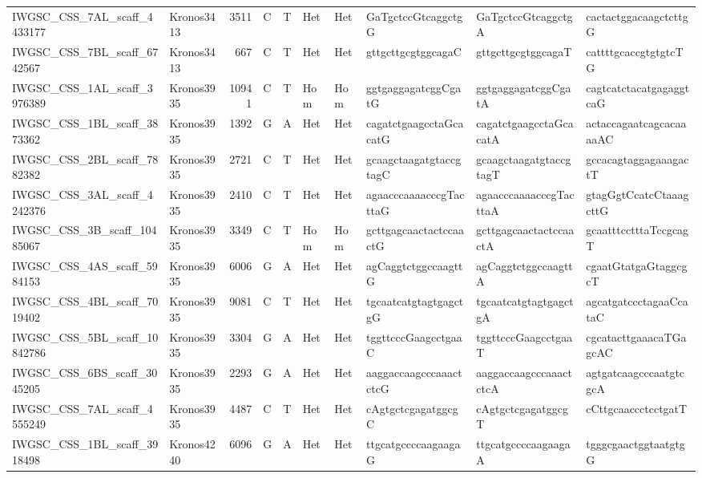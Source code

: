 \begin{longtable}{llrlllllll}
 IWGSC\_CSS\_7AL\_scaff\_4433177  & Kronos3413 &  3511 & C    & T     & Het    & Het   & GaTgctccGtcaggctgG       & GaTgctccGtcaggctgA       & cactactggacaagctcttgG    \\
 IWGSC\_CSS\_7BL\_scaff\_6742567  & Kronos3413 &   667 & C    & T     & Het    & Het   & gttgcttgcgtggcagaC       & gttgcttgcgtggcagaT       & cattttgcaccgtgtgtcTG     \\
 IWGSC\_CSS\_1AL\_scaff\_3976389  & Kronos3935 & 10941 & C    & T     & Hom    & Hom   & ggtgaggagatcggCgatG      & ggtgaggagatcggCgatA      & cagtcatctacatgagaggtcaG  \\
 IWGSC\_CSS\_1BL\_scaff\_3873362  & Kronos3935 &  1392 & G    & A     & Het    & Het   & cagatctgaagcctaGcacatG   & cagatctgaagcctaGcacatA   & actaccagaatcagcacaaaaAC  \\
 IWGSC\_CSS\_2BL\_scaff\_7882382  & Kronos3935 &  2721 & C    & T     & Het    & Het   & gcaagctaagatgtaccgtagC   & gcaagctaagatgtaccgtagT   & gccacagtaggagaaagactT    \\
 IWGSC\_CSS\_3AL\_scaff\_4242376  & Kronos3935 &  2410 & C    & T     & Het    & Het   & agaacccaaaacccgTacttaG   & agaacccaaaacccgTacttaA   & gtagGgtCcatcCtaaagcttG   \\
 IWGSC\_CSS\_3B\_scaff\_10485067  & Kronos3935 &  3349 & C    & T     & Hom    & Hom   & gcttgagcaactactccaactG   & gcttgagcaactactccaactA   & gcaatttcctttaTccgcagT    \\
 IWGSC\_CSS\_4AS\_scaff\_5984153  & Kronos3935 &  6006 & G    & A     & Het    & Het   & agCaggtctggccaagttG      & agCaggtctggccaagttA      & cgaatGtatgaGtaggcgcT     \\
 IWGSC\_CSS\_4BL\_scaff\_7019402  & Kronos3935 &  9081 & C    & T     & Het    & Het   & tgcaatcatgtagtgagctgG    & tgcaatcatgtagtgagctgA    & agcatgatccctagaaCcataC   \\
 IWGSC\_CSS\_5BL\_scaff\_10842786 & Kronos3935 &  3304 & G    & A     & Het    & Het   & tggttcccGaagcctgaaC      & tggttcccGaagcctgaaT      & cgcatacttgaaacaTGagcAC   \\
 IWGSC\_CSS\_6BS\_scaff\_3045205  & Kronos3935 &  2293 & G    & A     & Het    & Het   & aaggaccaagcccaaactctcG   & aaggaccaagcccaaactctcA   & agtgatcaagcccaatgtcgcA   \\
 IWGSC\_CSS\_7AL\_scaff\_4555249  & Kronos3935 &  4487 & C    & T     & Het    & Het   & cAgtgctcgagatggcgC       & cAgtgctcgagatggcgT       & cCttgcaaccctcctgatT      \\
 IWGSC\_CSS\_1BL\_scaff\_3918498  & Kronos4240 &  6096 & G    & A     & Het    & Het   & ttgcatgccccaagaagaG      & ttgcatgccccaagaagaA      & tgggcgaactggtaatgtgG     \\

\end{longtable}
